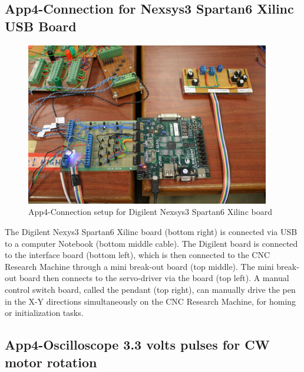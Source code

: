\pagebreak
\subsection{App4-Connection for Nexsys3 Spartan6 Xilinc USB Board}

\begin{figure}[htbp]
	\begin{center}
		\includegraphics[width=0.95\textwidth]{./07-images/img-Ch4App/connection-setup-Nexsys3-Spartan6-Xilinc-board.jpg}
		\caption{App4-Connection setup for Digilent Nexsys3 Spartan6 Xilinc board}
		\label{fig:App4-connection-setup-Nexsys3-Spartan6-Xilinc-board.jpg}
	\end{center}
\end{figure}
The Digilent Nexys3 Spartan6 Xilinc board (bottom right) is connected via USB to a computer Notebook (bottom middle cable). The Digilent board is connected to the interface board (bottom left), which is then connected to the CNC Research Machine through a mini break-out board (top middle). The mini break-out board then connects to the servo-driver via the board (top left). A manual control switch board, called the pendant (top right), can manually drive the pen in the X-Y directions simultaneously on the CNC Research Machine, for homing or initialization tasks. 

\subsection{App4-Oscilloscope 3.3 volts pulses for CW motor rotation}

